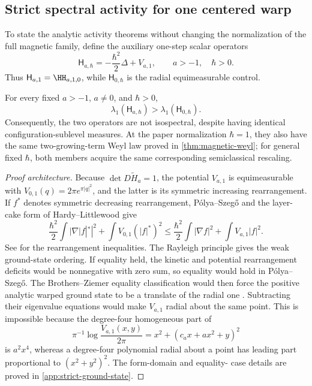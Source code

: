 \subsection{Strict spectral activity for one centered warp}
\label{sec:strict-ground-state}

To state the analytic activity theorems without changing the normalization
of the full magnetic family, define the auxiliary one-step scalar operators
\begin{equation}
 \mathsf H_{a,\hbar}
 =-\frac{\hbar^2}{2}\Delta+V_{a,1},
 \qquad a>-1,\quad \hbar>0.
 \label{eq:scalar-hbar-family}
\end{equation}
Thus \(\mathsf H_{a,1}=\HH_{a,1,0}\), while
\(\mathsf H_{0,\hbar}\) is the radial equimeasurable control.

\begin{theorem}
\label{thm:strict-ground-state}
For every fixed \(a>-1\), \(a\neq0\), and \(\hbar>0\),
\begin{equation}
 \lambda_1(\mathsf H_{a,\hbar})
 >\lambda_1(\mathsf H_{0,\hbar}).
 \label{eq:strict-ground-state}
\end{equation}
Consequently, the two operators are not isospectral, despite having identical
configuration-sublevel measures.  At the paper normalization \(\hbar=1\),
they also have the same two-growing-term Weyl law proved in
\cref{thm:magnetic-weyl}; for general fixed \(\hbar\), both members acquire
the same corresponding semiclassical rescaling.
\end{theorem}

\begin{proof}[Proof architecture]
Because \(\det D\widetilde H_a=1\), the potential \(V_{a,1}\) is
equimeasurable with \(V_{0,1}(q)=2\pi e^{\pi|q|^2}\), and the latter is its
symmetric increasing rearrangement.  If \(f^*\) denotes symmetric decreasing
rearrangement, P\'olya--Szeg\H{o} and the layer-cake form of
Hardy--Littlewood give
\[
 \frac{\hbar^2}{2}\int|\nabla |f|^*|^2
 +\int V_{0,1}(|f|^*)^2
 \le
 \frac{\hbar^2}{2}\int|\nabla f|^2
 +\int V_{a,1}|f|^2
 .
\]
See \citet{LiebLoss2001} for the rearrangement inequalities.  The Rayleigh
principle gives the weak ground-state ordering.  If equality held, the
kinetic and potential rearrangement deficits would be nonnegative with zero
sum, so equality would hold in P\'olya--Szeg\H{o}.  The Brothers--Ziemer
equality classification would then force the positive
analytic warped ground state to be a translate of the radial one
\citep{BrothersZiemer1988}.  Subtracting their eigenvalue equations would
make \(V_{a,1}\) radial about the same point.  This is impossible because
the degree-four homogeneous part of
\[
 \pi^{-1}\log\frac{V_{a,1}(x,y)}{2\pi}
 =x^2+(c_ax+ax^2+y)^2
\]
is \(a^2x^4\), whereas a degree-four polynomial radial about a point has
leading part proportional to \((x^2+y^2)^2\).  The form-domain and equality-
case details are proved in \cref{app:strict-ground-state}.
\end{proof}

